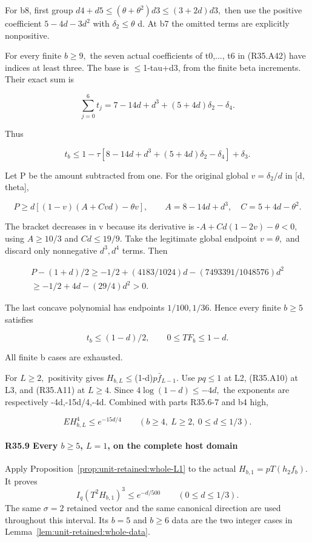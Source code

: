For b8, first group \(d4+d5\le (\theta+\theta^2)d3\le (3+2d)d3,\allowbreak \) then use the positive coefficient \(5-4d-3d^2\) with \(\delta_2\le \theta\) d. At b7 the omitted terms are explicitly nonpositive.

For every finite \(b\ge 9,\allowbreak \) the seven actual coefficients of t0,..., t6 in (R35.A42) have indices at least three. The base is \ensuremath{\le}1-tau+d3, from the finite beta increments. Their exact sum is

\[
\sum_{j=0}^6t_j=7-14d+d^3+(5+4d)\delta_2-\delta_4.
\]

Thus

\[
t_b\le1-\tau[8-14d+d^3+(5+4d)\delta_2-\delta_4]+\delta_3. \tag{R35.A44}
\]

Let P be the amount subtracted from one. For the original global \(v=\delta_2/d\) in [d, theta],

\[
P\ge d[(1-v)(A+Cvd)-\theta v],\qquad
A=8-14d+d^3,\quad C=5+4d-\theta^2.
\]

The bracket decreases in v because its derivative is
-\(A+Cd(1-2v)-\theta<0,\allowbreak \) using \(A\ge 10/3\) and \(Cd\le 19/9.\)
Take the legitimate global endpoint \(v=\theta,\allowbreak \) and discard only nonnegative \(d^3,\allowbreak  d^4\) terms. Then

\[
\begin{gathered}
P-(1+d)/2\ge-1/2+(4183/1024)d-(7493391/1048576)d^2\\
\ge-1/2+4d-(29/4)d^2>0.
\end{gathered}\tag{R35.A45}
\]

The last concave polynomial has endpoints \(1/100,\allowbreak  1/36.\) Hence every finite \(b\ge 5\) satisfies

\[
t_b\le(1-d)/2,\qquad 0\le TF_b\le1-d. \tag{R35.A46}
\]

All finite b cases are exhausted.

For \(L\ge 2,\allowbreak \) positivity gives \(H_{b,\allowbreak  L}\)\ensuremath{\le}(1-d)\(p\bar f_{L-1}\). Use \(pq\le 1\) at L2, (R35.A10) at L3, and (R35.A11) at \(L\ge 4.\) Since \(4\log(1-d)\le -4d,\allowbreak \) the exponents are respectively -4d,-15d/4,-4d. Combined with parts R35.6-7 and b4 high,

\[
EH_{b,L}^4\le e^{-15d/4}\qquad(b\ge4,\ L\ge2,\ 0\le d\le1/3). \tag{R35.A47}
\]

\paragraph{R35.9 Every $b\ge5$, $L=1$, on the complete host domain}
Apply Proposition~\ref{prop:unit-retained:whole-L1} to the actual
$H_{b,1}=pT(h_2f_b)$. It proves
\[
 I_q(T^2H_{b,1})^3\le e^{-d/500}\qquad(0\le d\le1/3).
\]
The same $\sigma=2$ retained vector and the same canonical direction
are used throughout this interval. Its $b=5$ and $b\ge6$ data are
the two integer cases in Lemma~\ref{lem:unit-retained:whole-data}.

